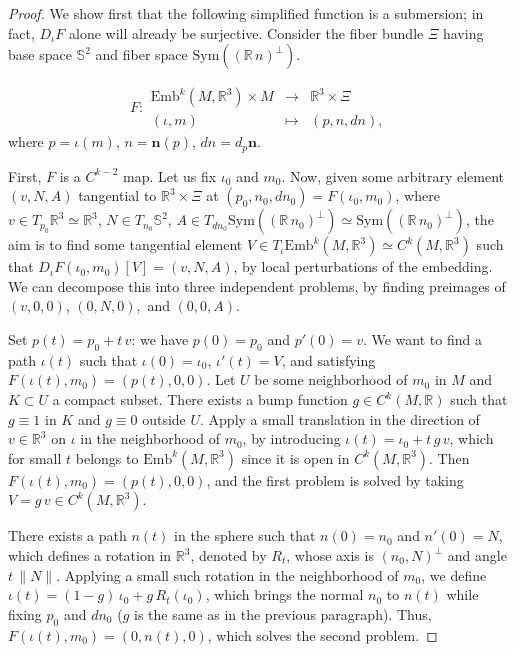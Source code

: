 \documentclass[11pt]{article}
\newcommand{\R}{\mathbb{R}}
\newcommand{\io}{\iota}
\newcommand{\nbf}{\mathbf{n}}
\newcommand{\Emb}{\mathrm{Emb}^k(M,\R^3)}
\theoremstyle{plain}
\theoremstyle{definition}
\theoremstyle{remark}
\begin{document}
\begin{proof}
We show first that the following simplified function is a submersion; in fact, $D_\io F$ alone will already be surjective. Consider the fiber bundle $\Xi$ having base space $\mathbb{S}^2$ and fiber space $\mathrm{Sym}((\R \, n)^\perp)$.
 
\begin{equation}
	F:
	\begin{array}{ccc}
		\Emb \times M & \to & \R^3 \times \Xi \\
		(\io, m) & \mapsto & (p, n, dn),
	\end{array}
\end{equation}
where $p = \io(m)$, $n = \nbf(p)$, $dn =  d_{p}\nbf$.

First, $F$ is a $C^{k-2}$ map.
Let us fix $\io_0$ and $m_0$.
Now, given some arbitrary element $(v, N, A)$ tangential to $\R^3 \times \Xi$ at $(p_0,n_0, dn_0) = F(\io_0,m_0)$, where $v \in T_{p_0} \R^3 \simeq \R^3$, $N \in T_{n_0} \mathbb{S}^2$, $A \in T_{dn_0} \mathrm{Sym}((\R \, n_0)^\perp) \simeq \mathrm{Sym}((\R \, n_0)^\perp)$, the aim is to find some tangential element $V \in T_\io \Emb \simeq C^k(M,\R^3)$ such that $D_\io F(\io_0,m_0) [V] = (v,N,A)$, by local perturbations of the embedding. We can decompose this into three independent problems, by finding preimages of $(v,0,0)$, $(0,N,0),$ and $(0,0,A)$. 

Set $p(t) = p_0 + t \, v$: we have $p(0) = p_0$ and $p'(0) = v$. We want to find a path $\io(t)$ such that $\io(0) = \io_0$, $\io'(t) = V$, and satisfying $F(\io(t),m_0) = (p(t),0,0)$.
Let $U$ be some neighborhood of $m_0$ in $M$ and $K \subset U$ a compact subset. There exists a bump function $g \in C^k(M,\R)$ such that $g \equiv 1$ in $K$ and $g \equiv 0$ outside $U$.
Apply a small translation in the direction of $v \in \R^3$ on $\io$ in the neighborhood of $m_0$, by introducing $\io(t) = \io_0 + t \, g \, v$, which for small $t$ belongs to $\Emb$ since it is open in $C^k(M,\R^3)$. Then $F(\io(t),m_0) = (p(t),0,0)$, and the first problem is solved by taking $V = g \, v \in C^k(M,\R^3)$.

There exists a path $n(t)$ in the sphere such that $n(0) = n_0$ and $n'(0) = N$, which defines a rotation in $\R^3$, denoted by $R_t$, whose axis is $(n_0,N)^\perp$ and angle $t \, \|N\|$. Applying a small such rotation in the neighborhood of $m_0$, we define $\io(t) = (1-g) \, \io_0 + g \, R_t(\io_0)$, which brings the normal $n_0$ to $n(t)$ while fixing $p_0$ and $dn_0$ ($g$ is the same as in the previous paragraph). Thus, $F(\io(t),m_0) = (0,n(t),0)$, which solves the second problem.


\end{proof}
\end{document}
